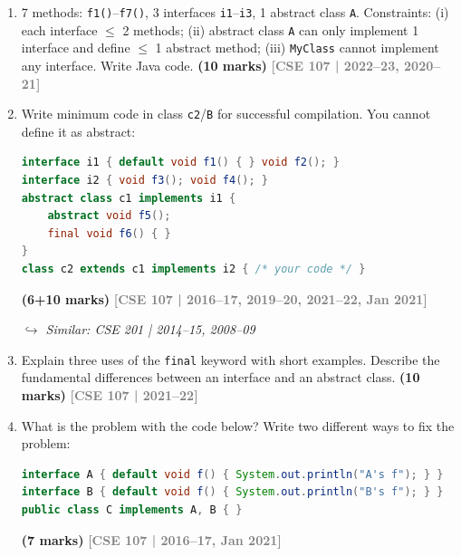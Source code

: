 \documentclass[12pt,a3paper]{article}
\newcommand{\yr}[1]{\hfill\textcolor{gray}{\small\textbf{[#1]}}}
\newcommand{\mk}[1]{\textcolor{orange!70!black}{\small\textbf{(#1 marks)}}}
\newcommand{\variant}[1]{\par\vspace{1pt}\textcolor{blue!50!black}%
  {\footnotesize\textit{$\hookrightarrow$ Similar: #1}}}
\begin{document}
\begin{enumerate}



\item 7 methods: \texttt{f1()}--\texttt{f7()}, 3 interfaces \texttt{i1}--\texttt{i3}, 1 abstract class \texttt{A}. Constraints: (i) each interface $\leq$ 2 methods; (ii) abstract class \texttt{A} can only implement 1 interface and define $\leq$ 1 abstract method; (iii) \texttt{MyClass} cannot implement any interface. Write Java code. \mk{10}
\yr{CSE 107 | 2022--23, 2020--21}




\item Write minimum code in class \texttt{c2}/\texttt{B} for successful compilation. You cannot define it as abstract:
\begin{lstlisting}[language=Java]
interface i1 { default void f1() { } void f2(); }
interface i2 { void f3(); void f4(); }
abstract class c1 implements i1 {
    abstract void f5();
    final void f6() { }
}
class c2 extends c1 implements i2 { /* your code */ }
\end{lstlisting}
\mk{6+10}
\yr{CSE 107 | 2016--17, 2019--20, 2021--22, Jan 2021}
\variant{CSE 201 | 2014--15, 2008--09}




\item Explain three uses of the \texttt{final} keyword with short examples. Describe the fundamental differences between an interface and an abstract class. \mk{10}
\yr{CSE 107 | 2021--22}






\item What is the problem with the code below? Write two different ways to fix the problem:
\begin{lstlisting}[language=Java]
interface A { default void f() { System.out.println("A's f"); } }
interface B { default void f() { System.out.println("B's f"); } }
public class C implements A, B { }
\end{lstlisting}
\mk{7}
\yr{CSE 107 | 2016--17, Jan 2021}





\end{enumerate}
\end{document}
